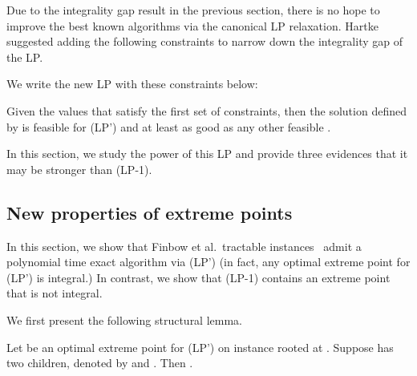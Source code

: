 
\label{sec:newlp}

\newcommand{\vset}{{\mathcal{V}}}
Due to the integrality gap result in the previous section, there is no hope to improve the best known algorithms via the canonical LP relaxation. 
Hartke~\cite{Hartke2006} suggested adding the following constraints to narrow down the integrality gap of the LP. 
 

We write the new LP with these constraints below: 
\vspace{0.1in}

\noindent
{}

\begin{proposition} 
\label{prop:setyvalues}
Given the values  that satisfy the first set of constraints, then the solution  defined by  is feasible for (LP') and at least as good as any other feasible .  
\end{proposition} 

In this section, we study the power of this LP and provide three evidences that it may be stronger than (LP-1). 

\subsection{New properties of extreme points}
In this section, we show that Finbow et al.~tractable instances~\cite{FinbowG09} admit a polynomial time exact algorithm via (LP') (in fact, any optimal extreme point for (LP') is integral.) 
In contrast, we show that (LP-1) contains an extreme point that is not integral.   



We first present the following structural lemma. 
\begin{lemma}
\label{lem: extreme}  
Let  be an optimal extreme point for (LP') on instance  rooted at . Suppose  has two children, denoted by  and .  
Then .  
\end{lemma}  

